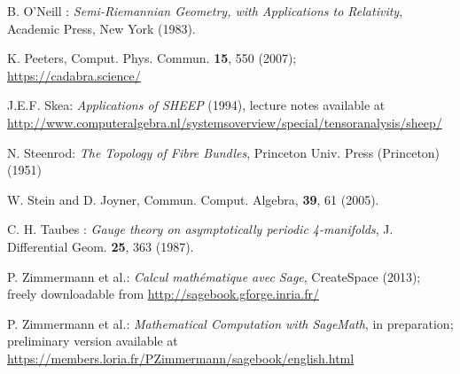\begin{thebibliography}{123}
B. O'Neill : {\em Semi-Riemannian Geometry, with Applications to Relativity},
Academic Press, New York (1983).

K. Peeters, Comput. Phys. Commun. {\bf 15}, 550 (2007);\\
\url{https://cadabra.science/}

J.E.F. Skea: \emph{Applications of SHEEP} (1994), lecture notes available at
\url{http://www.computeralgebra.nl/systemsoverview/special/tensoranalysis/sheep/}

N. Steenrod: \emph{The Topology of Fibre Bundles}, Princeton Univ. Press (Princeton) (1951)

W. Stein and D. Joyner, Commun. Comput. Algebra, {\bf 39}, 61 (2005).

C. H. Taubes : {\em Gauge theory on asymptotically periodic 4-manifolds},
J. Differential Geom. {\bf 25}, 363 (1987).

P. Zimmermann et al.: {\it Calcul math\'ematique avec Sage}, CreateSpace (2013);
freely downloadable from \url{http://sagebook.gforge.inria.fr/}

P. Zimmermann et al.: {\it Mathematical Computation with SageMath},
in preparation; preliminary version available at
\url{https://members.loria.fr/PZimmermann/sagebook/english.html}

\end{thebibliography}
